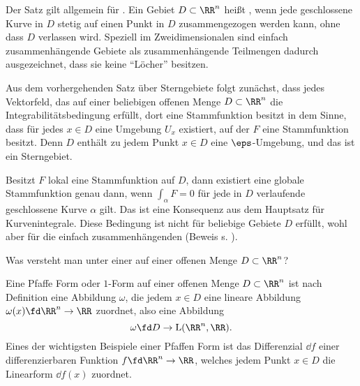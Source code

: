 \begin{antwort}
  Der Satz gilt allgemein für . 
  Ein Gebiet $D\subset \RR^n$ heißt , wenn 
  jede geschlossene Kurve in $D$ stetig auf einen Punkt in $D$ 
  zusammengezogen werden kann, ohne dass $D$ verlassen wird. 
  Speziell im Zweidimensionalen sind einfach zusammenhängende Gebiete  
  als zusammenhängende Teilmengen dadurch ausgezeichnet, dass 
  sie keine "`Löcher"' besitzen. 

  Aus dem vorhergehenden Satz über Sterngebiete folgt zunächst, dass 
  jedes Vektorfeld, das auf einer beliebigen offenen Menge 
  $D\subset \RR^n$ die Integrabilitätsbedingung erfüllt, 
  dort  eine Stammfunktion 
  besitzt in dem Sinne, dass für jedes $x\in D$ eine Umgebung 
  $U_x$ existiert, auf der $F$ eine Stammfunktion besitzt. 
  Denn $D$ enthält zu jedem Punkt $x\in D$ eine $\eps$-Umgebung, 
  und das ist ein Sterngebiet. 

  Besitzt $F$ lokal eine Stammfunktion auf $D$, dann existiert eine globale 
  Stammfunktion genau dann, wenn $\int_\alpha F=0$ für jede in $D$ 
  verlaufende geschlossene Kurve $\alpha$ gilt. Das ist eine Konsequenz 
  aus dem Hauptsatz für Kurvenintegrale. Diese Bedingung ist nicht für 
  beliebige 
  Gebiete $D$ erfüllt, wohl aber für die einfach zusammenhängenden (Beweis 
  s. \citep{Koenig}).
  \AntEnd  
\end{antwort} 

\begin{frage}
  Was versteht man unter einer  auf einer 
  offenen Menge $D\subset\RR^n$? 
\end{frage}

\begin{antwort}
  Eine Pfaff\sch e Form oder $1$-Form auf einer offenen Menge $D\subset\RR^n$ 
  ist nach Definition eine Abbildung $\omega$, die jedem $x\in D$ 
  eine lineare Abbildung $\omega(x)\fd \RR^n\to \RR$ zuordnet, also 
  eine Abbildung 
  \[
  \omega\fd D \to \mathrm{L}(\RR^n,\RR).
  \]
  Eines der wichtigsten Beispiele einer Pfaff\sch en Form ist das 
  Differenzial $\dd f$ einer differenzierbaren 
  Funktion $f\fd \RR^n\to \RR$, welches  
  jedem Punkt $x\in D$ die Linearform $\dd f(x)$ zuordnet. \AntEnd
\end{antwort} 

